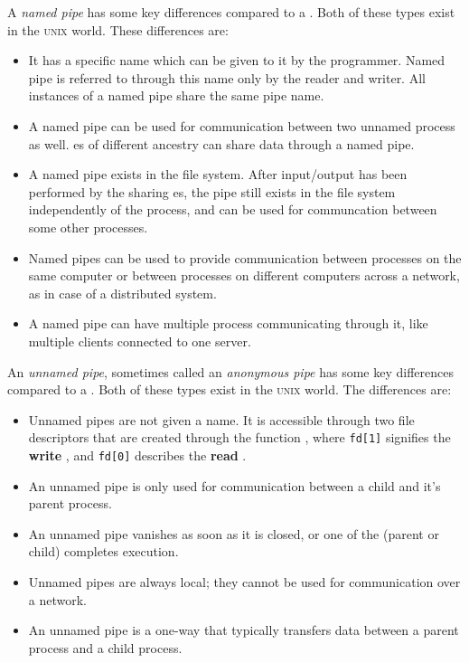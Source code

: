 \begin{definition}\label{def:Named_Pipe}
  A \emph{named pipe} has some key differences compared to a .
  Both of these types exist in the \textsc{unix} world.
  These differences are:
  \begin{itemize}[noitemsep]
  \item It has a specific name which can be given to it by the programmer.
    Named pipe is referred to through this name only by the reader and writer.
    All instances of a named pipe share the same pipe name.
  \item A named pipe can be used for communication between two unnamed process as well.
    es of different ancestry can share data through a named pipe.
  \item A named pipe exists in the file system.
    After input/output has been performed by the sharing es, the pipe still exists in the file system independently of the process, and can be used for communcation between some other processes.
  \item Named pipes can be used to provide communication between processes on the same computer or between processes on different computers across a network, as in case of a distributed system.
  \item A named pipe can have multiple process communicating through it, like multiple clients connected to one server.
  \end{itemize}
\end{definition}

\begin{definition}\label{def:Unnamed_Pipe}
  An \emph{unnamed pipe}, sometimes called an \emph{anonymous pipe} has some key differences compared to a .
  Both of these types exist in the \textsc{unix} world.
  The differences are:
  \begin{itemize}[noitemsep]
  \item Unnamed pipes are not given a name.
    It is accessible through two file descriptors that are created through the function , where \texttt{fd[1]} signifies the \textbf{write} , and \texttt{fd[0]} describes the \textbf{read} .
  \item An unnamed pipe is only used for communication between a child and it's parent process.
  \item An unnamed pipe vanishes as soon as it is closed, or one of the  (parent or child) completes execution.
  \item Unnamed pipes are always local; they cannot be used for communication over a network.
  \item An unnamed pipe is a one-way  that typically transfers data between a parent process and a child process.
  \end{itemize}
\end{definition}

